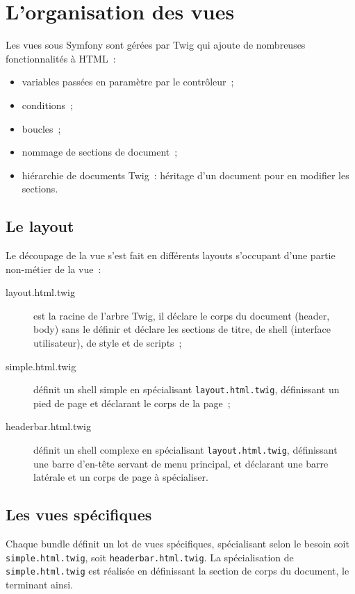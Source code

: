 \section{L'organisation des vues}

Les vues sous Symfony sont gérées par Twig qui ajoute de nombreuses fonctionnalités à HTML~:
\begin{itemize}
    \item variables passées en paramètre par le contrôleur~;
    \item conditions~;
    \item boucles~;
    \item nommage de sections de document~;
    \item hiérarchie de documents Twig~: héritage d'un document pour en modifier les sections.
\end{itemize}

\subsection{Le layout}

Le découpage de la vue s'est fait en différents layouts s'occupant d'une partie non-métier de la vue~:
\begin{description}
    \item [layout.html.twig] est la racine de l'arbre Twig, il déclare le corps du document (header, body) sans le définir et déclare les sections de titre, de shell (interface utilisateur), de style et de scripts~;
    \item [simple.html.twig] définit un shell simple en spécialisant \verb|layout.html.twig|, définissant un pied de page et déclarant le corps de la page~;
    \item [headerbar.html.twig]  définit un shell complexe en spécialisant \verb|layout.html.twig|, définissant une barre d'en-tête servant de menu principal, et déclarant une barre latérale et un corps de page à spécialiser.
\end{description}

\subsection{Les vues spécifiques}

Chaque bundle définit un lot de vues spécifiques, spécialisant selon le besoin soit \verb|simple.html.twig|, soit \verb|headerbar.html.twig|.
La spécialisation de \verb|simple.html.twig| est réalisée en définissant la section de corps du document, le terminant ainsi.


